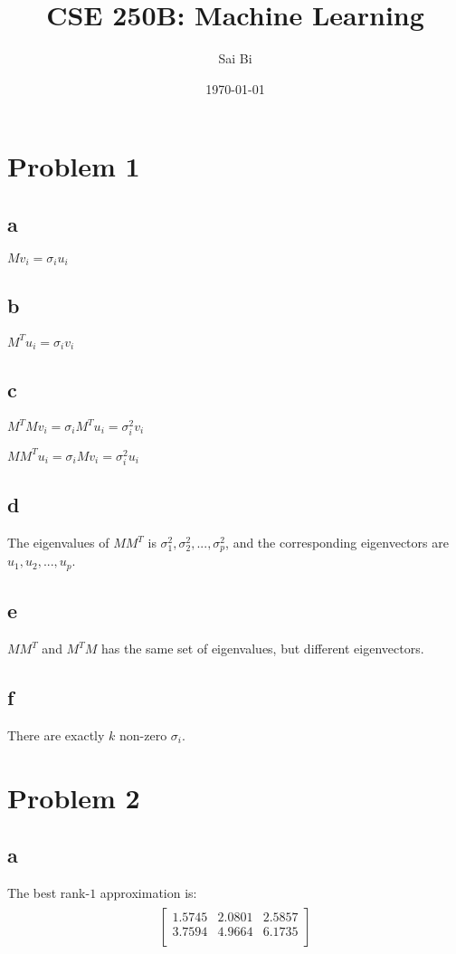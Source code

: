 \documentclass[a4paper,11pt]{article}
\theoremstyle{mytheor}
\begin{document}
\title{CSE 250B: Machine Learning}

\author{Sai Bi}

\date{\today}

\maketitle

\section*{Problem 1}
\subsection*{a}
$Mv_i = \sigma_i u_i$

\subsection*{b}
$M^Tu_i = \sigma_i v_i$

\subsection*{c}
$M^T Mv_i = \sigma_i M^T u_i = \sigma_i^2 v_i$

$MM^Tu_i = \sigma_i M v_i = \sigma_i^2 u_i$ 

\subsection*{d}
The eigenvalues of $MM^T$ is $\sigma_1^2, \sigma_2^2, ..., \sigma_p^2$, and the corresponding 
eigenvectors are $u_1, u_2, ..., u_p$.

\subsection*{e}
$MM^T$ and $M^TM$ has the same set of eigenvalues, but different eigenvectors.

\subsection*{f}
There are exactly $k$ non-zero $\sigma_i$.

\section*{Problem 2}
\subsection*{a}
The best rank-$1$ approximation is:
\begin{align}
\begin{split}
\begin{bmatrix}
    1.5745   & 2.0801  &  2.5857 \\
    3.7594   & 4.9664  &  6.1735 \\
\end{bmatrix}
\end{split}
\end{align}
\end{document}
